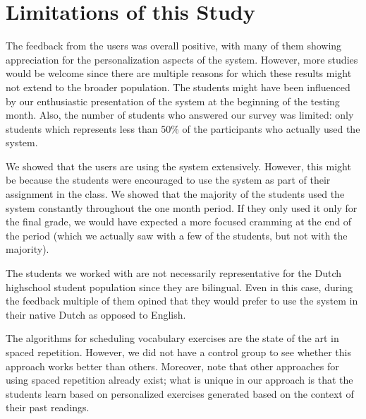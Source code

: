 
\section{Limitations of this Study}
\label{sec:limitations}

The feedback from the users was overall positive, with many of them showing appreciation for the personalization aspects of the system. However, more studies would be welcome since there are multiple reasons for which these results might not extend to the broader population. The students might have been influenced by our enthusiastic presentation of the system at the beginning of the testing month. Also, the number of students who answered our survey was limited: only \surveyrespondents students which represents less than 50\% of the participants who actually used the system.

We showed that the users are using the system extensively. However, this might be because the students were encouraged to use the system as part of their assignment in the class. We showed that the majority of the students used the system constantly throughout the one month period. If they only used it only for the final grade, we would have expected a more focused cramming at the end of the period (which we actually saw with a few of the students, but not with the majority). 

The students we worked with are not necessarily representative for the Dutch highschool student population since they are bilingual. Even in this case, during the feedback multiple of them opined that they would prefer to use the system in their native Dutch as opposed to English.


The algorithms for scheduling vocabulary exercises are the state of the art in spaced repetition. However, we did not have a control group to see whether this approach works better than others. Moreover, note that other approaches for using spaced repetition already exist; what is unique in our approach is that the students learn based on personalized exercises generated based on the context of their past readings.




